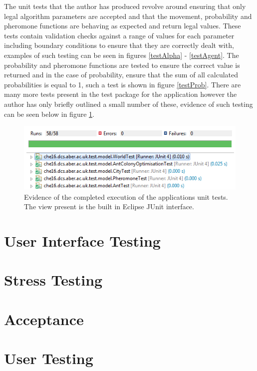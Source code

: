 The unit tests that the author has produced revolve around ensuring that only legal algorithm parameters are accepted and that the movement, probability and pheromone functions are behaving as expected and return legal values. These tests contain validation checks against a range of values for each parameter including boundary conditions to ensure that they are correctly dealt with, examples of such testing can be seen in figures \ref{testAlpha} - \ref{testAgent}. The probability and pheromone functions are tested to ensure the correct value is returned and in the case of probability, ensure that the sum of all calculated probabilities is equal to 1, such a test is shown in figure \ref{testProb}. There are many more tests present in the test package for the application however the author has only briefly outlined a small number of these, evidence of such testing can be seen below in figure \ref{testSS}.

\begin{figure}[H]
\centering
\includegraphics[scale=0.8]{Images/chapter6/testSS}
\caption{Evidence of the completed execution of the applications unit tests. The view present is the built in Eclipse JUnit interface.}
\label{testSS}
\end{figure}

\section{User Interface Testing}

\section{Stress Testing}

\section{Acceptance}

\section{User Testing}

